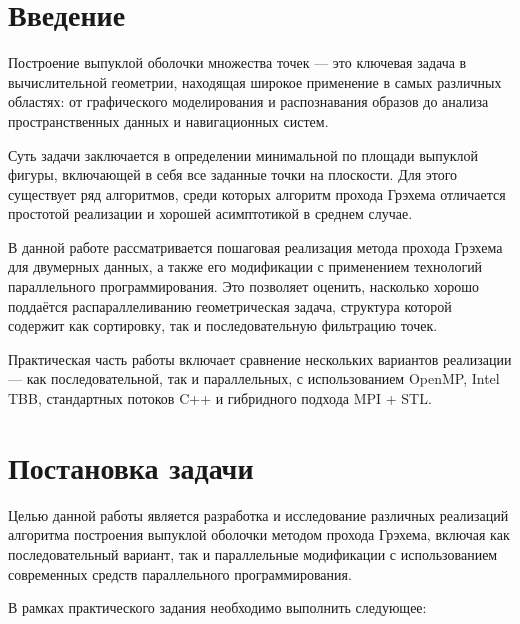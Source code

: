 \documentclass[12pt,a4paper]{extarticle}
\begin{document}
\tableofcontents
\newpage

\section{Введение}

Построение выпуклой оболочки множества точек — это ключевая задача в вычислительной геометрии, находящая широкое применение в самых различных областях: 
от графического моделирования и распознавания образов до анализа пространственных данных и навигационных систем. 

Суть задачи заключается в определении минимальной по площади выпуклой фигуры, включающей в себя все заданные точки на плоскости. 
Для этого существует ряд алгоритмов, среди которых алгоритм прохода Грэхема отличается простотой реализации и хорошей асимптотикой в среднем случае.

В данной работе рассматривается пошаговая реализация метода прохода Грэхема для двумерных данных, а также его модификации с применением технологий параллельного программирования. 
Это позволяет оценить, насколько хорошо поддаётся распараллеливанию геометрическая задача, структура которой содержит как сортировку, так и последовательную фильтрацию точек.

Практическая часть работы включает сравнение нескольких вариантов реализации — как последовательной, так и параллельных, с использованием OpenMP, Intel TBB, 
стандартных потоков C++ и гибридного подхода MPI + STL. 


\section*{Постановка задачи}

Целью данной работы является разработка и исследование различных реализаций алгоритма построения выпуклой оболочки методом прохода Грэхема, 
включая как последовательный вариант, так и параллельные модификации с использованием современных средств параллельного программирования.

В рамках практического задания необходимо выполнить следующее:
\end{document}
